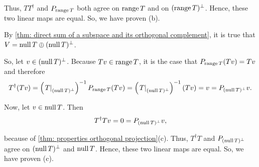 \begin{prf}
  Thus, $TT^\dagger$ and $P_{\operatorname{range} T}$ both agree on $\operatorname{range} T$ and on $(\operatorname{range} T)^\bot$. Hence, these two linear maps are equal. So, we have proven (b).

   By \ref{thm: direct sum of a subspace and its orthogonal complement}, it is true that $V=\operatorname{null} T \oplus (\operatorname{null} T)^\bot$.

  So, let $v \in (\operatorname{null} T)^\bot$. Because $Tv \in \operatorname{range} T$, it is the case that $P_{\operatorname{range} T} (T v) = Tv$ and therefore
  \begin{equation}
    T^\dagger (T v)
    = \left( \left. T \right|_{(\operatorname{null} T)^\bot} \right)^{-1} P_{\operatorname{range} T} (Tv)
    = \left( \left. T \right|_{(\operatorname{null} T)^\bot} \right)^{-1} (Tv) = v = P_{(\operatorname{null} T)^\bot} v.
  \end{equation}

  Now, let $v \in \operatorname{null} T$. Then
  \[
    T^\dagger T v = 0 = P_{(\operatorname{null} T)^\bot} v,
  \]

  because of \ref{thm: properties orthogonal projection}(c). Thus, $T^\dagger T$ and $P_{(\operatorname{null} T)^\bot}$ agree on $(\operatorname{null} T)^\bot$ and $\operatorname{null} T$. Hence, these two linear maps are equal. So, we have proven (c).
\end{prf}

